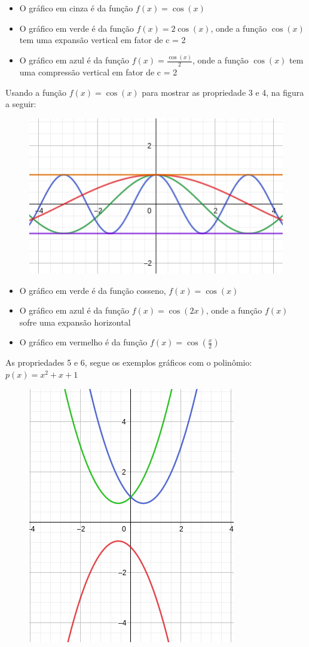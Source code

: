 \begin{multicols*}{2}
    \begin{itemize}
        \item O gráfico em cinza é da função $f(x) = \cos(x)$
        \item O gráfico em verde é da função $f(x) = 2 \cos(x)$, onde a função $\cos(x)$ tem uma 						expansão vertical em fator de c = 2
        \item O gráfico em azul é da função $f(x) = \frac{\cos(x)}{2}$, onde a função $\cos(x)$ tem 					uma compressão vertical em fator de c = 2
    \end{itemize}
    Usando a função $f(x) = \cos(x)$ para mostrar as propriedade 3 e 4, na figura a seguir:
    \begin{figure}[H]
        \centering
        \includegraphics[scale=0.4]{assets/rafael/img9.png}
    \end{figure}
    \begin{itemize}
        \item O gráfico em verde é da função cosseno, $f(x) = \cos(x)$
        \item O gráfico em azul é da função $f(x) = \cos(2x)$, onde a função $f(x)$ sofre uma expansão 						horizontal
        \item O gráfico em vermelho é da função $f(x) = \cos \left( \frac{x}{2} \right) $
    \end{itemize}
    As propriedades 5 e 6, segue os exemplos gráficos com o polinômio: $p(x) = x^2 + x +1$
    \begin{figure}[H]
        \centering
        \includegraphics[scale=0.35]{assets/rafael/img11.png}

\end{figure}
\end{multicols*}
